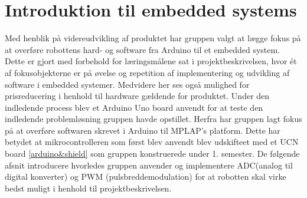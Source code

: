 \section{Introduktion til embedded systems}
Med henblik på videreudvikling af produktet har gruppen valgt at lægge fokus på at overføre robottens hard- og software fra Arduino til et embedded system. Dette er gjort med forbehold for læringsmålene sat i projektbeskrivelsen, hvor ét af fokusobjekterne er på øvelse og repetition af implementering og udvikling af software i embedded systemer. 
\newline 
Medvidere her ses også mulighed for prisreducering i henhold til hardware gældende for produktet. Under den indledende process blev et Arduino Uno board anvendt for at teste den indledende problemløsning gruppen havde opstillet. 
\newline
Herfra har gruppen lagt fokus på at overføre softwaren skrevet i Arduino til MPLAP's platform. Dette har betydet at mikrocontrolleren som først blev anvendt blev udskifteet med et UCN board \ref{arduino&shield} som gruppen konstruerede under 1. semester. 
\newline
\newline
De følgende afsnit introducere hvorledes gruppen anvender og implementere ADC(analog til digital konverter) og PWM (pulsbreddemodulation) for at robotten skal virke bedst muligt i henhold til projektbeskrivelsen.  
   





